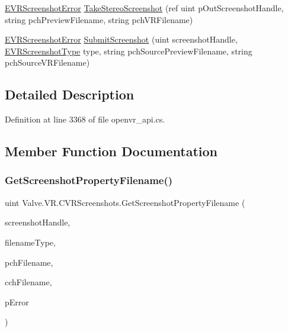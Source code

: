 \begin{DoxyCompactItemize}
\item 
\mbox{\hyperlink{namespace_valve_1_1_v_r_ac73c6dcb1af8fe045a626296a21e226b}{E\+V\+R\+Screenshot\+Error}} \mbox{\hyperlink{class_valve_1_1_v_r_1_1_c_v_r_screenshots_a704fb95aa209fa60fd688c583b9b7d89}{Take\+Stereo\+Screenshot}} (ref uint p\+Out\+Screenshot\+Handle, string pch\+Preview\+Filename, string pch\+V\+R\+Filename)
\item 
\mbox{\hyperlink{namespace_valve_1_1_v_r_ac73c6dcb1af8fe045a626296a21e226b}{E\+V\+R\+Screenshot\+Error}} \mbox{\hyperlink{class_valve_1_1_v_r_1_1_c_v_r_screenshots_a0da676537255072488496df5f668df07}{Submit\+Screenshot}} (uint screenshot\+Handle, \mbox{\hyperlink{namespace_valve_1_1_v_r_a033ac579445f0992130b11ba62c9b7ae}{E\+V\+R\+Screenshot\+Type}} type, string pch\+Source\+Preview\+Filename, string pch\+Source\+V\+R\+Filename)
\end{DoxyCompactItemize}


\subsection{Detailed Description}


Definition at line 3368 of file openvr\+\_\+api.\+cs.



\subsection{Member Function Documentation}
\mbox{\label{class_valve_1_1_v_r_1_1_c_v_r_screenshots_a16edbbb8fd1c87e355df924682eb407b}} 
\subsubsection{\texorpdfstring{GetScreenshotPropertyFilename()}{GetScreenshotPropertyFilename()}}
{\footnotesize\ttfamily uint Valve.\+V\+R.\+C\+V\+R\+Screenshots.\+Get\+Screenshot\+Property\+Filename (\begin{DoxyParamCaption}\item[{uint}]{screenshot\+Handle,  }\item[{\mbox{\hyperlink{namespace_valve_1_1_v_r_a5a78926aed6b08da8e0e0b8f79911e34}{E\+V\+R\+Screenshot\+Property\+Filenames}}}]{filename\+Type,  }\item[{System.\+Text.\+String\+Builder}]{pch\+Filename,  }\item[{uint}]{cch\+Filename,  }\item[{ref \mbox{\hyperlink{namespace_valve_1_1_v_r_ac73c6dcb1af8fe045a626296a21e226b}{E\+V\+R\+Screenshot\+Error}}}]{p\+Error }\end{DoxyParamCaption})}



